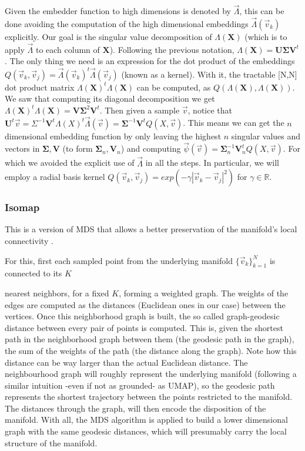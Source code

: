 \documentclass[11pt, a4paper, twoside]{article} %
\newcommand{\R}{\mathbb{R}} %
\DeclareRobustCommand{\mybox}[2][gray!10]{%
\begin{tcolorbox}[   %
        left=0.2cm,
        right=0.2cm,
        top=0.15cm,
        bottom=0.15cm,
        colback=#1,
        colframe=#1,
        width=\dimexpr\textwidth\relax, 
        enlarge left by=0mm,
        boxsep=5pt,
        arc=0pt,outer arc=0pt,
        ]
        #2
\end{tcolorbox}
}
\begin{document}
\mybox{Given the embedder function to high dimensions is denoted by $\vec{\Lambda}$, this can be done avoiding the computation of the high dimensional embeddings $\vec{\Lambda}(\vec{v}_k)$ explicitly. Our goal is the singular value decomposition of $\Lambda(\pmb{X})$ (which is to apply $\vec{\Lambda}$ to each column of $\pmb{X}$). Following the previous notation, $\Lambda(\pmb{X})=\pmb{U}\pmb{\Sigma}\pmb{V}^t$. The only thing we need is an expression for the dot product of the embeddings $Q(\vec{v}_k, \vec{v}_j)=\vec{\Lambda}(\vec{v}_k)^t\vec{\Lambda}(\vec{v}_j)$ (known as a kernel). With it, the tractable [N,N] dot product matrix $\Lambda(\pmb{X})^t\Lambda(\pmb{X})$ can be computed, as $Q(\Lambda(\pmb{X}), \Lambda(\pmb{X}))$. We saw that computing its diagonal decomposition we get $\Lambda(\pmb{X})^t\Lambda(\pmb{X})=\pmb{V}\pmb{\Sigma}^2\pmb{V}^t$. Then given a sample $\vec{v}$, notice that $\pmb{U}^t\vec{v}=\Sigma^{-1}\pmb{V}^t\Lambda(X)^t\vec{\Lambda}(\vec{v})=\pmb{\Sigma}^{-1}\pmb{V}^tQ(X,\vec{v})$. This means we can get the $n$ dimensional embedding function by only leaving the highest $n$ singular values and vectors in $\pmb{\Sigma},\pmb{V}$ (to form $\pmb{\Sigma}_n,\pmb{V}_n$) and computing $\vec{\psi}(\vec{v})=\pmb{\Sigma}_n^{-1}\pmb{V}_n^tQ(X,\vec{v})$. For which we avoided the explicit use of $\vec{\Lambda}$ in all the steps. In particular, we will employ a radial basis kernel $Q(\vec{v}_k,\vec{v}_j)=exp(-\gamma |\vec{v}_k-\vec{v}_j|^2)$ for $\gamma\in\R$.
}
\vspace{-0.55cm}

\subsubsection*{Isomap}\vspace{-0.2cm}
This is a version of MDS that allows a better preservation of the manifold's local connectivity \cite{isomap}. 

\mybox{For this, first each sampled point from the underlying manifold $\{\vec{v}_k\}_{k=1}^N$ is connected to its $K$}\mybox{  nearest neighbors, for a fixed $K$, forming a weighted graph. The weights of the edges are computed as the distances (Euclidean ones in our case) between the vertices. Once this neighborhood graph is built, the so called graph-geodesic distance between every pair of points is computed. This is, given the shortest path in the neighborhood graph between them (the geodesic path in the graph), the sum of the weights of the path (the distance along the graph). Note how this distance can be way larger than the actual Euclidean distance. The neighbourhood graph will roughly represent the underlying manifold (following a similar intuition -even if not as grounded- as UMAP), so the geodesic path represents the shortest trajectory between the points restricted to the manifold. The distances through the graph, will then encode the disposition of the manifold. With all, the MDS algorithm is applied to build a lower dimensional graph with the same geodesic distances, which will presumably carry the local structure of the manifold. %
}
\vspace{-0.35cm}
\end{document}
